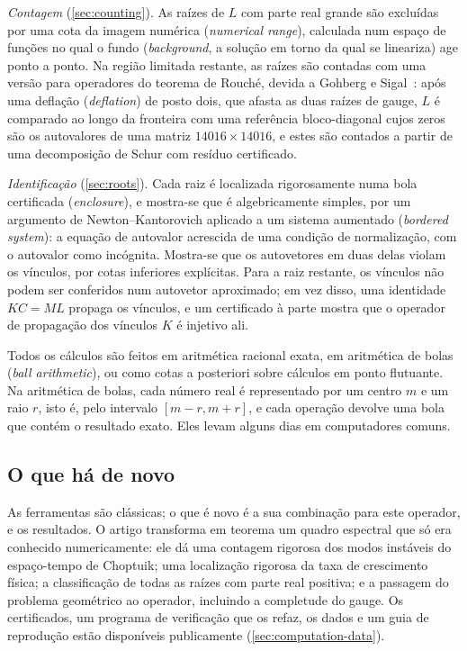 \emph{Contagem} (\cref{sec:counting}). As raízes de $L$ com parte real grande são excluídas por uma cota da
imagem numérica (\emph{numerical range}), calculada num espaço de funções no qual o fundo (\emph{background}, a solução
em torno da qual se lineariza) age ponto a ponto. Na região limitada
restante, as raízes são contadas com uma versão para operadores do teorema de Rouch\'e, devida a Gohberg e
Sigal~\cite{GohbergSigal1971}: após uma deflação (\emph{deflation}) de posto dois, que afasta as duas raízes de gauge, $L$ é comparado ao longo da
fronteira com uma referência bloco-diagonal cujos zeros são os autovalores de uma matriz $14016\times14016$, e estes
são contados a partir de uma decomposição de Schur com resíduo certificado.

\emph{Identificação} (\cref{sec:roots}). Cada raiz é localizada rigorosamente numa bola certificada (\emph{enclosure}), e mostra-se que é
algebricamente simples, por um argumento de Newton--Kantorovich aplicado a um sistema aumentado (\emph{bordered system}):
a equação de autovalor acrescida de uma condição de normalização, com o autovalor como incógnita. Mostra-se que os autovetores em duas delas violam os vínculos, por cotas inferiores
explícitas. Para a raiz restante, os vínculos não podem ser conferidos num autovetor aproximado; em vez disso, uma
identidade $KC=ML$ propaga os vínculos, e um certificado à parte mostra que o operador de propagação dos vínculos
$K$ é injetivo ali.

Todos os cálculos são feitos em aritmética racional exata, em aritmética de bolas (\emph{ball arithmetic}), ou como
cotas a posteriori sobre cálculos em ponto flutuante. Na aritmética de bolas, cada número real é representado por um
centro $m$ e um raio $r$, isto é, pelo intervalo $[m-r,m+r]$, e cada operação devolve uma bola que contém o resultado
exato. Eles levam alguns dias em computadores comuns.

\subsection{O que há de novo}

As ferramentas são clássicas; o que é novo é a sua combinação para este operador, e os resultados. O artigo transforma em
teorema um quadro espectral que só era conhecido numericamente: ele dá uma contagem rigorosa dos modos instáveis do
espaço-tempo de Choptuik; uma localização rigorosa da
taxa de crescimento física; a classificação de todas as raízes com parte real positiva; e a passagem do problema
geométrico ao operador, incluindo a completude do gauge. Os certificados, um programa de verificação que
os refaz, os dados e um guia de reprodução estão disponíveis publicamente (\cref{sec:computation-data}).

